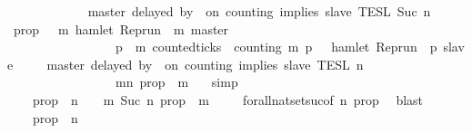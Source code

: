 \begin{isabellebody}
{}\isanewline
\ \ \ \ \ {\isacharparenright}\isanewline
\ \ \ \ \ {\isasyminter}\ {\isasymlbrakk}\ master\ delayed\ by\ {}\ on\ counting\ implies\ slave\ {\isasymrbrakk}\isactrlsub T\isactrlsub E\isactrlsub S\isactrlsub L\isactrlbsup {\isasymge}\ Suc\ n\isactrlesup {\isacartoucheclose}\isanewline
%
\isadelimproof
%
\endisadelimproof
%
\isatagproof
{}\isamarkupfalse%
\ {\isacharminus}\isanewline
\ \ \isamarkupfalse%
\ {\isacharquery}prop\ {\isacharequal}\ {\isacartoucheopen}{\isasymlambda}{\isasymrho}\ m{\isachardot}\ hamlet\ {\isacharparenleft}{\isacharparenleft}Rep{\isacharunderscore}run\ {\isasymrho}{\isacharparenright}\ m\ master{\isacharparenright}\ {\isasymlongrightarrow}\isanewline
\ \ \ \ \ \ \ \ \ \ \ \ \ \ \ \ \ {\isacharparenleft}{\isasymforall}p\ {\isasymge}\ m{\isachardot}\ counted{\isacharunderscore}ticks\ {\isasymrho}\ counting\ m\ p\ {}\ {\isasymlongrightarrow}\ hamlet\ {\isacharparenleft}{\isacharparenleft}Rep{\isacharunderscore}run\ {\isasymrho}{\isacharparenright}\ p\ slave{\isacharparenright}{\isacharparenright}{\isacartoucheclose}\isanewline
\ \ \isamarkupfalse%
\ {\isacartoucheopen}{\isasymlbrakk}\ master\ delayed\ by\ {}\ on\ counting\ implies\ slave\ {\isasymrbrakk}\isactrlsub T\isactrlsub E\isactrlsub S\isactrlsub L\isactrlbsup {\isasymge}\ n\isactrlesup \ {\isacharequal}\isanewline
\ \ \ \ \ \ \ \ \ \ \ \ \ \ \ \ {\isacharbraceleft}{\isasymrho}{\isachardot}\ {\isasymforall}m{\isasymge}n{\isachardot}\ {\isacharquery}prop\ {\isasymrho}\ m{\isacharbraceright}\ {\isacartoucheclose}\ \isamarkupfalse%
\ simp\isanewline
\ \ \isamarkupfalse%
\ \isamarkupfalse%
\ {\isacartoucheopen}{\isachardot}{\isachardot}{\isachardot}\ {\isacharequal}\ {\isacharbraceleft}{\isasymrho}{\isachardot}\ {\isacharquery}prop\ {\isasymrho}\ n\ {\isacharbraceright}\ {\isasyminter}\ {\isacharbraceleft}{\isasymrho}{\isachardot}\ {\isasymforall}m{\isasymge}\ Suc\ n{\isachardot}\ {\isacharquery}prop\ {\isasymrho}\ m\ {\isacharbraceright}{\isacartoucheclose}\isanewline
\ \ \isamarkupfalse%
\ forall{\isacharunderscore}nat{\isacharunderscore}set{\isacharunderscore}suc{\isacharbrackleft}of\ n\ {\isacartoucheopen}{\isacharquery}prop{\isacartoucheclose}{\isacharbrackright}\ \isamarkupfalse%
\ blast\isanewline
\ \ \isamarkupfalse%
\ \isamarkupfalse%
\ {\isacartoucheopen}{\isachardot}{\isachardot}{\isachardot}\ {\isacharequal}\ {\isacharbraceleft}{\isasymrho}{\isachardot}\ {\isacharquery}prop\ {\isasymrho}\ n{\isacharbraceright}\isanewline

\end{isabellebody}
